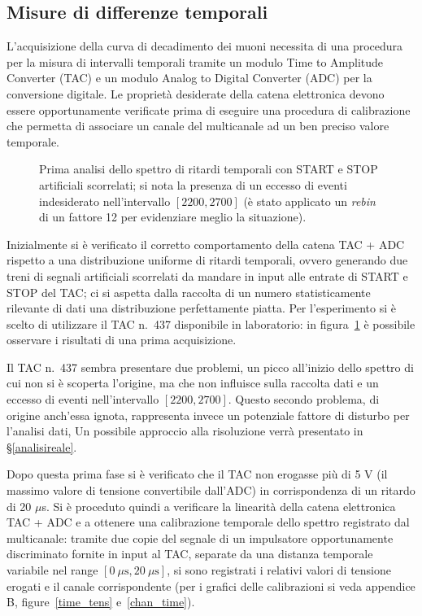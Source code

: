 \documentclass[10pt, oneside, a4paper]{article}   	%
\begin{document}
\subsection{Misure di differenze temporali}\label{tac}
L'acquisizione della curva di decadimento dei muoni necessita di una procedura per la misura di intervalli temporali tramite un modulo Time to Amplitude Converter (TAC) e un modulo Analog to Digital Converter (ADC) per la conversione digitale. Le proprietà desiderate della catena elettronica devono essere opportunamente verificate prima di eseguire una procedura di calibrazione che permetta di associare un canale del multicanale ad un ben preciso valore temporale.
%
\begin{figure}[b!]
  \centering  
  
  \caption{Prima analisi dello spettro di ritardi temporali con START e STOP artificiali scorrelati; si nota la presenza di un eccesso di eventi indesiderato nell'intervallo $[2200,2700]$ (è stato applicato un \emph{rebin} di un fattore 12 per evidenziare meglio la situazione).}
  \label{rumore1}
\end{figure}
%

Inizialmente si è verificato il corretto comportamento della catena TAC + ADC rispetto a una distribuzione uniforme di ritardi temporali, ovvero generando due treni di segnali artificiali scorrelati da mandare in input alle entrate di START e STOP del TAC; ci si aspetta dalla raccolta di un numero statisticamente rilevante di dati una distribuzione perfettamente piatta. Per l'esperimento si è scelto di utilizzare il TAC n.~437 disponibile in laboratorio: in figura~\ref{rumore1} è possibile osservare i risultati di una prima acquisizione.

Il TAC n.~437 sembra presentare due problemi, un picco all'inizio dello spettro di cui non si è scoperta l'origine, ma che non influisce sulla raccolta dati e un eccesso di eventi nell'intervallo $[2200,2700]$. Questo secondo problema, di origine anch'essa ignota, rappresenta invece un potenziale fattore di disturbo per l'analisi dati, Un possibile approccio alla risoluzione verrà presentato in \S\ref{analisireale}.

Dopo questa prima fase si è verificato che il TAC  non erogasse più di 5 V (il massimo valore di tensione convertibile dall'ADC) in corrispondenza di un ritardo di 20 $\mu$s. Si è proceduto quindi a verificare la linearità della catena elettronica TAC + ADC e a ottenere una calibrazione temporale dello spettro registrato dal multicanale: tramite due copie del segnale di un impulsatore opportunamente discriminato fornite in input al TAC, separate da una distanza temporale variabile nel range $[0 \ \mu \mbox{s},20 \ \mu \mbox{s}]$, si sono registrati i relativi valori di tensione erogati e il canale corrispondente (per i grafici delle calibrazioni si veda appendice B, figure~\ref{time_tens} e~\ref{chan_time}).
\end{document}
